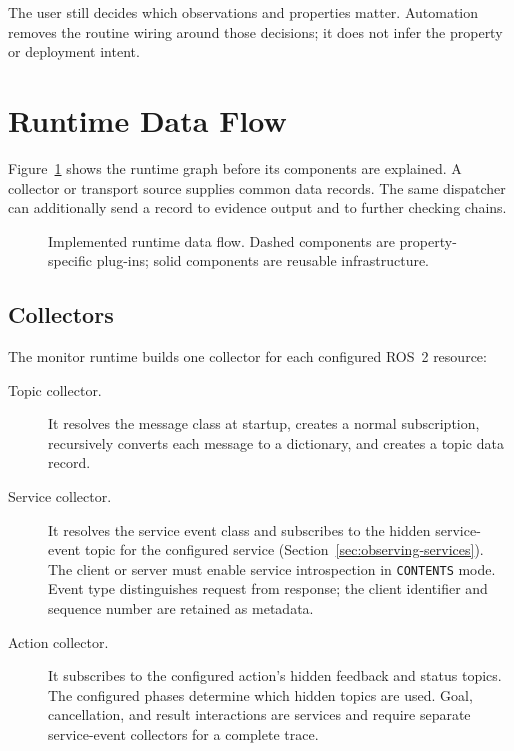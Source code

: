 The user still decides which observations and properties matter. Automation
removes the routine wiring around those decisions; it does not infer the
property or deployment intent.

\section{Runtime Data Flow}

Figure~\ref{fig:runtime-pipeline} shows the runtime graph before its components
are explained. A collector or transport source supplies common data records.
The same dispatcher can additionally send a record to evidence output and to
further checking chains.

\begin{figure}[htbp]
  \centering
  \resizebox{\textwidth}{!}{}
  \caption{Implemented runtime data flow. Dashed components are
  property-specific plug-ins; solid components are reusable infrastructure.}
  \label{fig:runtime-pipeline}
\end{figure}

\subsection{Collectors}\label{sec:impl-collectors}

The monitor runtime builds one collector for each configured ROS~2 resource:

\begin{description}
  \item[Topic collector.] It resolves the message class at startup, creates a
  normal subscription, recursively converts each message to a dictionary, and
  creates a topic data record.

  \item[Service collector.] It resolves the service event class and subscribes
  to the hidden service-event topic for the configured service
  (Section~\ref{sec:observing-services}). The client or server must enable
  service introspection in \texttt{CONTENTS} mode. Event type distinguishes
  request from response; the client identifier and sequence number are retained
  as metadata.

  \item[Action collector.] It subscribes to the configured action's hidden
  feedback and status topics. The configured phases determine which hidden
  topics are used. Goal, cancellation, and result interactions are
  services and require separate service-event collectors for a complete trace.
\end{description}

